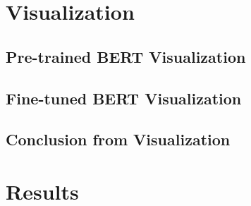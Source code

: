 \documentclass[fyp]{socreport}
\begin{document}
\section{Visualization}
\subsection{Pre-trained BERT Visualization}


\subsection{Fine-tuned BERT Visualization}


\subsection{Conclusion from Visualization}




\section{Results}
\end{document}
